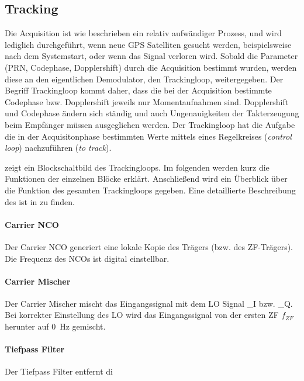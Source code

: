 \subsection{Tracking}
Die Acquisition ist wie beschrieben ein relativ aufwändiger Prozess, und wird lediglich durchgeführt, wenn neue GPS Satelliten gesucht werden, beispielsweise nach dem Systemstart, oder wenn das Signal verloren wird. Sobald die Parameter (PRN, Codephase, Dopplershift) durch die Acquisition bestimmt wurden, werden diese an den eigentlichen Demodulator, den Trackingloop, weitergegeben. Der Begriff Trackingloop kommt daher, dass die bei der Acquisition bestimmte Codephase bzw. Dopplershift jeweils nur Momentaufnahmen sind. Dopplershift und Codephase ändern sich ständig und auch Ungenauigkeiten der Takterzeugung beim Empfänger müssen ausgeglichen werden. Der Trackingloop hat die Aufgabe die in der Acquisitonphase bestimmten Werte mittels eines Regelkreises (\emph{control loop}) nachzuführen (\emph{to track}). 


 zeigt ein Blockschaltbild des Trackingloops. Im folgenden werden kurz die Funktionen der einzelnen Blöcke erklärt. Anschließend wird ein Überblick über die Funktion des gesamten Trackingloops gegeben. Eine detaillierte Beschreibung des ist in \cite{borre2007software} zu finden.

\paragraph{Carrier \gls{NCO}} Der Carrier \gls{NCO} generiert eine lokale Kopie des Trägers (bzw. des ZF-Trägers). Die Frequenz des NCOs ist digital einstellbar.  

\paragraph{Carrier Mischer} Der Carrier Mischer mischt das Eingangssignal \gpsin mit dem LO Signal \gpslo_I bzw. \gpslo_Q. Bei korrekter Einstellung des LO wird das Eingangssignal von der ersten ZF $f_{ZF}$ herunter auf \SI{0}{\Hz} gemischt.

\paragraph{Tiefpass Filter} Der Tiefpass Filter entfernt di

